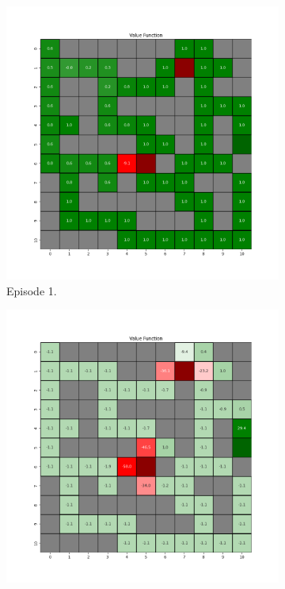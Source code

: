 \documentclass{assignment}
\begin{document}
\begin{figure}[H]
    \begin{subfigure}{0.3\textwidth}
        \includegraphics[width=\textwidth]{figures/value_td/gamma_sweep/value_function_alpha_0.1_gamma_0.1_epsilon_0.2_iteration_1.png}
    \caption{Episode 1.}
    \end{subfigure}\hfill
    \begin{subfigure}{0.3\textwidth}
        \includegraphics[width=\textwidth]{figures/value_td/gamma_sweep/value_function_alpha_0.1_gamma_0.1_epsilon_0.2_iteration_50.png}

\end{subfigure}
\end{figure}
\end{document}
